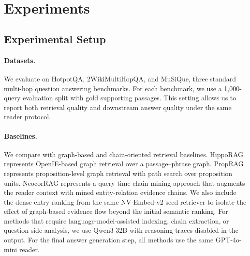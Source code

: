 %
%

\section{Experiments}
\label{sec:experiments}

\subsection{Experimental Setup}
\label{sec:experiments:setup}

\paragraph{Datasets.}
We evaluate on HotpotQA, 2WikiMultiHopQA, and MuSiQue, three standard
multi-hop question answering benchmarks. For each benchmark, we use a
1,000-query evaluation split with gold supporting passages. This setting
allows us to report both retrieval quality and downstream answer quality
under the same reader protocol.

\paragraph{Baselines.}
We compare \methodname{} with graph-based and chain-oriented retrieval
baselines. HippoRAG represents OpenIE-based graph retrieval over a
passage--phrase graph. PropRAG represents proposition-level graph
retrieval with path search over proposition units. NeocorRAG represents
a query-time chain-mining approach that augments the reader context with
mined entity-relation evidence chains. We also include the dense entry
ranking from the same NV-Embed-v2 seed retriever to isolate the effect
of graph-based evidence flow beyond the initial semantic ranking. For
methods that require language-model-assisted indexing, chain extraction,
or question-side analysis, we use Qwen3-32B with reasoning traces
disabled in the output. For the final answer generation step, all methods
use the same GPT-4o-mini reader.

